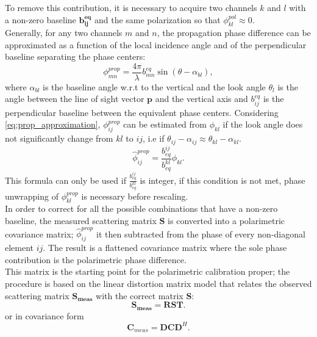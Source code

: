 To remove this contribution, it is necessary to acquire two channels $k$ and $l$ with a non-zero baseline $\mathbf{b_{ij}^{eq}}$ and the same polarization so that $\phi_{kl}^{pol} \approx 0$.\\ Generally, for any two channels $m$ and $n$,  the propagation phase difference can be approximated as a function of the local incidence angle and of the perpendicular baseline separating the phase centers:
\begin{equation}\label{eq:prop_approximation}
		\phi_{mn}^{prop} = \frac{4\pi}{\lambda} b_{mn}^{eq} \sin(\theta - \alpha_{bl}),
\end{equation}
where $\alpha_{bl}$ is the baseline angle w.r.t to the vertical and the look angle $\theta_l$ is the angle between the line of sight vector $\mathbf{p}$ and the vertical axis and $b_{ij}^{eq}$ is the perpendicular baseline between the equivalent phase centers.
Considering \autoref{eq:prop_approximation}, $\phi_{ij}^{prop}$ can be estimated from $\phi_{kl}$ if the look angle does not significantly change from $kl$ to $ij$, i.e if $\theta_{ij} - \alpha_{ij} \approx \theta_{kl} - \alpha_{kl}$. 
\begin{equation}
	\hat{\phi}_{ij}^{prop} = \frac{b_{eq}^{ij}}{b_{eq}^{kl}} \phi_{kl}.
\end{equation}
This formula can only be used if $\frac{b_{eq}^{ij}}{b_{eq}^{kl}}$ is integer\cite{Massonnet1996}, if this condition is not met, phase unwrapping of $\phi_{kl}^{prop}$ is necessary before rescaling.\\
In order to correct for all the possible combinations that have a non-zero baseline, the measured scattering matrix $\mathbf{S}$ is converted into a polarimetric covariance matrix;  $\hat{\phi}_{ij}^{prop}$ it then subtracted from the phase of every non-diagonal element $ij$. The result is a flattened covariance matrix where the sole phase contribution is the polarimetric phase difference.\\
This matrix is the starting point for the polarimetric calibration proper;
the procedure is based on the linear distortion matrix model\cite{Saraband1990, Sarabandi1992a} that relates the observed scattering matrix $\mathbf{S_{meas}}$ with the correct matrix $\mathbf{S}$:
\begin{equation}\label{eq:distorsion_scattering}
	\mathbf{S_{meas}} = \mathbf{R} \mathbf{S} \mathbf{T}.
\end{equation}
or in covariance form
\begin{equation}\label{eq:covariance_distortion}
	\mathbf{C}_{meas} = \mathbf{D} \mathbf{C} \mathbf{D}^{H}.
\end{equation}
